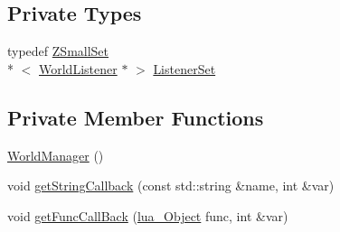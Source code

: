 \subsection*{Private Types}
\begin{DoxyCompactItemize}
\item 
typedef \hyperlink{namespaceZeta_a44c717c98a964d0ebf6ea954cb9c91bf}{Z\+Small\+Set}\\*
$<$ \hyperlink{classZeta_1_1WorldListener}{World\+Listener} $\ast$ $>$ \hyperlink{classZeta_1_1WorldManager_aab11e4268a3e5b0d650668134bf73ef0}{Listener\+Set}
\end{DoxyCompactItemize}
\subsection*{Private Member Functions}
\begin{DoxyCompactItemize}
\item 
\hyperlink{classZeta_1_1WorldManager_af20bcdad4b701dd084d1fec3b6f76548}{World\+Manager} ()
\item 
void \hyperlink{classZeta_1_1WorldManager_aa0d5cfadc1b453dee71185e07f9faa66}{get\+String\+Callback} (const std\+::string \&name, int \&var)
\item 
void \hyperlink{classZeta_1_1WorldManager_aca449116d0f397380766bea8999c23ad}{get\+Func\+Call\+Back} (\hyperlink{ZetaConfig_8hpp_ae7be32b73848041a60f2412f72bbb221}{lua\+\_\+\+Object} func, int \&var)
\end{DoxyCompactItemize}
